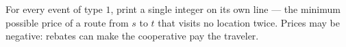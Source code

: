 For every event of type $1$, print a single integer on its own line --- the minimum possible price of a route from $s$ to $t$ that visits no location twice. Prices may be negative: rebates can make the cooperative pay the traveler.
